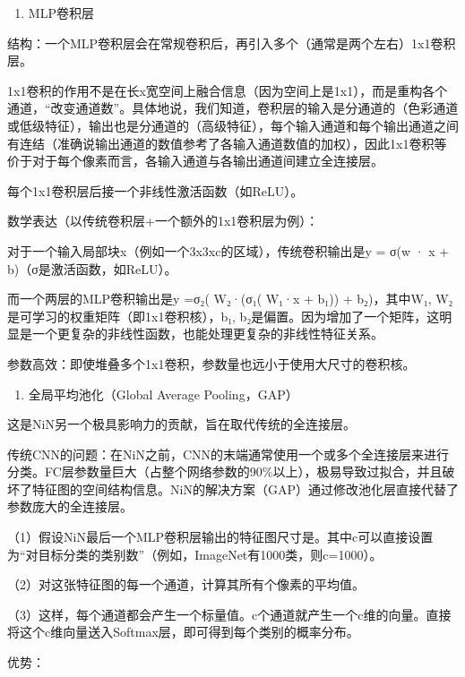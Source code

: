 \begin{enumerate}
\def\labelenumi{\arabic{enumi}.}
\tightlist
\item
  MLP卷积层
\end{enumerate}

结构：一个MLP卷积层会在常规卷积后，再引入多个（通常是两个左右）1x1卷积层。

1x1卷积的作用不是在长x宽空间上融合信息（因为空间上是1x1），而是重构各个通道，``改变通道数''。具体地说，我们知道，卷积层的输入是分通道的（色彩通道或低级特征），输出也是分通道的（高级特征），每个输入通道和每个输出通道之间有连结（准确说输出通道的数值参考了各输入通道数值的加权），因此1x1卷积等价于对于每个像素而言，各输入通道与各输出通道间建立全连接层。

每个1x1卷积层后接一个非线性激活函数（如ReLU）。

数学表达（以传统卷积层+一个额外的1x1卷积层为例）：

对于一个输入局部块x（例如一个3x3xc的区域），传统卷积输出是y = σ(w · x + b)（σ是激活函数，如ReLU）。

而一个两层的MLP卷积输出是y =σ₂( W₂·(σ₁( W₁·x + b₁)) + b₂)，其中W₁, W₂是可学习的权重矩阵（即1x1卷积核），b₁, b₂是偏置。因为增加了一个矩阵，这明显是一个更复杂的非线性函数，也能处理更复杂的非线性特征关系。

参数高效：即使堆叠多个1x1卷积，参数量也远小于使用大尺寸的卷积核。

\begin{enumerate}
\def\labelenumi{\arabic{enumi}.}
\setcounter{enumi}{1}
\tightlist
\item
  全局平均池化（Global Average Pooling，GAP）
\end{enumerate}

这是NiN另一个极具影响力的贡献，旨在取代传统的全连接层。

传统CNN的问题：在NiN之前，CNN的末端通常使用一个或多个全连接层来进行分类。FC层参数量巨大（占整个网络参数的90\%以上），极易导致过拟合，并且破坏了特征图的空间结构信息。NiN的解决方案（GAP）通过修改池化层直接代替了参数庞大的全连接层。

（1）假设NiN最后一个MLP卷积层输出的特征图尺寸是。其中c可以直接设置为``对目标分类的类别数''（例如，ImageNet有1000类，则c=1000）。

（2）对这张特征图的每一个通道，计算其所有个像素的平均值。

（3）这样，每个通道都会产生一个标量值。c个通道就产生一个c维的向量。直接将这个c维向量送入Softmax层，即可得到每个类别的概率分布。

优势：

